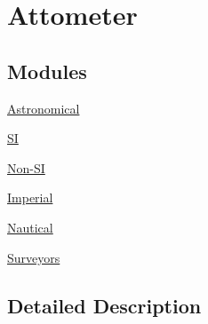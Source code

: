 \hypertarget{group___e_g_x_math-_conversions-_length_conversions-_s_i-_attometer}{}\section{Attometer}
\label{group___e_g_x_math-_conversions-_length_conversions-_s_i-_attometer}
\subsection*{Modules}
\begin{DoxyCompactItemize}
\item 
\mbox{\hyperlink{group___e_g_x_math-_conversions-_length_conversions-_s_i-_attometer-_astronomical}{Astronomical}}
\item 
\mbox{\hyperlink{group___e_g_x_math-_conversions-_length_conversions-_s_i-_attometer-_s_i}{SI}}
\item 
\mbox{\hyperlink{group___e_g_x_math-_conversions-_length_conversions-_s_i-_attometer-_non-_s_i}{Non-\/\+SI}}
\item 
\mbox{\hyperlink{group___e_g_x_math-_conversions-_length_conversions-_s_i-_attometer-_imperial}{Imperial}}
\item 
\mbox{\hyperlink{group___e_g_x_math-_conversions-_length_conversions-_s_i-_attometer-_nautical}{Nautical}}
\item 
\mbox{\hyperlink{group___e_g_x_math-_conversions-_length_conversions-_s_i-_attometer-_surveyors}{Surveyors}}
\end{DoxyCompactItemize}


\subsection{Detailed Description}
